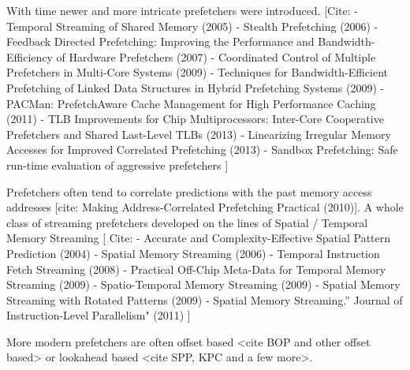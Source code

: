 \documentclass{sig-alternate}
\begin{document}
With time newer and more intricate prefetchers were introduced. [Cite:\newline
- Temporal Streaming of Shared Memory (2005)\newline
- Stealth Prefetching (2006)\newline
- Feedback Directed Prefetching: Improving the Performance and Bandwidth-Efficiency of Hardware Prefetchers (2007)\newline
- Coordinated Control of Multiple Prefetchers in Multi-Core Systems (2009)\newline
- Techniques for Bandwidth-Efficient Prefetching of Linked Data Structures in Hybrid Prefetching Systems (2009)\newline
- PACMan: PrefetchAware Cache Management for High Performance Caching (2011)\newline
- TLB Improvements for Chip Multiprocessors: Inter-Core Cooperative Prefetchers and Shared Last-Level TLBs (2013)\newline
- Linearizing Irregular Memory Accesses for Improved Correlated Prefetching (2013)\newline
- Sandbox Prefetching: Safe run-time evaluation of aggressive prefetchers\newline
]\newline

Prefetchers often tend to correlate predictions with the past memory access addresses [cite: Making Address-Correlated Prefetching Practical (2010)].  A whole class of streaming prefetchers developed on the lines of Spatial / Temporal Memory Streaming
[ Cite:\newline
- Accurate and Complexity-Effective Spatial Pattern Prediction (2004)\newline
- Spatial Memory Streaming (2006)\newline
- Temporal Instruction Fetch Streaming (2008)\newline
- Practical Off-Chip Meta-Data for Temporal Memory Streaming (2009)\newline
- Spatio-Temporal Memory Streaming (2009)\newline
- Spatial Memory Streaming with Rotated Patterns (2009)\newline
- Spatial Memory Streaming.” Journal of Instruction-Level Parallelism" (2011)\newline
]\newline

More modern prefetchers are often offset based <cite BOP and other offset based> or lookahead based <cite SPP, KPC and a few more>.
\end{document}
